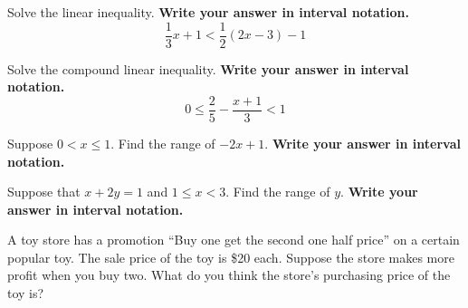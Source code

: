 \begin{exercise}

Solve the linear inequality. \textbf{Write your answer in interval
notation.} \[
\frac13x+1<\frac12(2x-3)-1
\]

\end{exercise}

\vspace*{6\baselineskip}

\begin{exercise}

Solve the compound linear inequality. \textbf{Write your answer in
interval notation.} \[
0\le \frac25-\frac{x+1}{3}< 1
\]

\end{exercise}

\vspace*{6\baselineskip}

\begin{exercise}

Suppose \(0< x \le 1\). Find the range of \(-2x+1\). \textbf{Write your
answer in interval notation.}

\end{exercise}

\vspace*{6\baselineskip}

\begin{exercise}

Suppose that \(x+2y=1\) and \(1\leq x< 3\). Find the range of \(y\).
\textbf{Write your answer in interval notation.}

\end{exercise}
\vspace*{6\baselineskip}

\begin{exercise}

A toy store has a promotion ``Buy one get the second one half price'' on
a certain popular toy. The sale price of the toy is \$20 each. Suppose
the store makes more profit when you buy two. What do you think the
store's purchasing price of the toy is?

\end{exercise}


